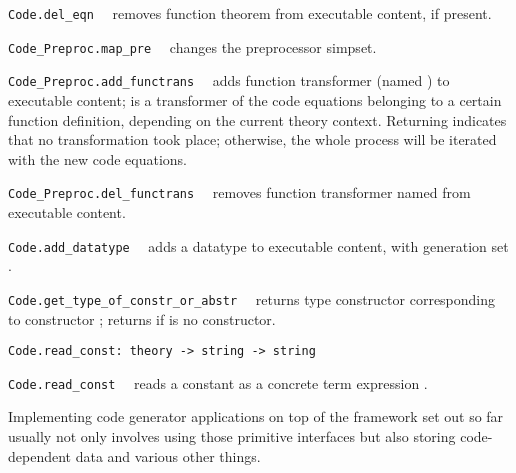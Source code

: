 \begin{isabellebody}
\begin{isamarkuptext}
\begin{description}
  \item \verb|Code.del_eqn|~~ removes function
     theorem  from executable content, if present.

  \item \verb|Code_Preproc.map_pre|~~ changes
     the preprocessor simpset.

  \item \verb|Code_Preproc.add_functrans|~~ adds
     function transformer  (named ) to executable content;
      is a transformer of the code equations belonging
     to a certain function definition, depending on the
     current theory context.  Returning  indicates that no
     transformation took place;  otherwise, the whole process will be iterated
     with the new code equations.

  \item \verb|Code_Preproc.del_functrans|~~ removes
     function transformer named  from executable content.

  \item \verb|Code.add_datatype|~~ adds
     a datatype to executable content, with generation
     set .

  \item \verb|Code.get_type_of_constr_or_abstr|~~
     returns type constructor corresponding to
     constructor ; returns 
     if  is no constructor.

  \end{description}%
\end{isamarkuptext}%
\isamarkuptrue%
%
\endisatagmlref
{\isafoldmlref}%
%
\isadelimmlref
%
\endisadelimmlref
%
\isamarkuptrue%
%
\isadelimmlref
%
\endisadelimmlref
%
\isatagmlref
%
\begin{isamarkuptext}%
\begin{mldecls}
  \verb|Code.read_const: theory -> string -> string|
  \end{mldecls}

  \begin{description}

  \item \verb|Code.read_const|~~
     reads a constant as a concrete term expression .

  \end{description}%
\end{isamarkuptext}%
\isamarkuptrue%
%
\endisatagmlref
{\isafoldmlref}%
%
\isadelimmlref
%
\endisadelimmlref
%
\isamarkuptrue%
%
\begin{isamarkuptext}%
Implementing code generator applications on top
  of the framework set out so far usually not only
  involves using those primitive interfaces
  but also storing code-dependent data and various
  other things.


\end{isamarkuptext}
\end{isabellebody}
